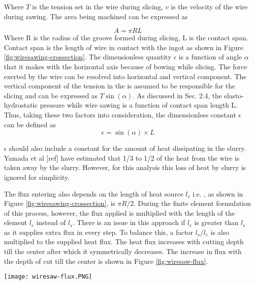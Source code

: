 Where $T$ is the tension set in the wire during slicing, $v$ is the velocity of the wire during sawing. The area being machined can be expressed as

\begin{equation}
A = \pi R L
   \label {wire_eq3}
\end{equation}
Where R is the radius of the groove formed during slicing, L is the contact span. Contact span is the length of wire in contact with the ingot as shown in Figure \ref{fig:wiresawing-crossection}. The dimensionless quantity $\epsilon$ is a function of angle $\alpha$ that it makes with the horizontal axis because of bowing while slicing. The force exerted by the wire can be resolved into horizontal and vertical component. The vertical component of the tension in the is assumed to be responsible for the slicing and can be expressed as $T \sin (\alpha)$. As discussed in Sec. 2.4, the elasto-hydrostatic pressure while wire sawing is a function of contact span length L. Thus, taking these two factors into consideration, the dimensionless constant $\epsilon$ can be defined as 
\begin{equation}
\epsilon = \sin(\alpha) \times L
   \label {wire_eq4}
\end{equation}

$\epsilon$ should also include a constant for the amount of heat dissipating in the slurry. Yamada et al [ref] have estimated that 1/3 to 1/2 of the heat from the wire is taken away by the slurry. However, for this analysis this loss of heat by slurry is ignored for simplicity.  

The flux entering also depends on the length of heat source $l_{s}$ i.e. , as shown in Figure \ref{fig:wiresawing-crossection}, is $\pi R /2 $. During the finite element formulation of this process, however, the flux applied is multiplied with the length of the element $l_{e}$ instead of $l_{s}$. There is an issue in this approach if $l_{e}$ is greater than $l_{s}$ as it supplies extra flux in every step. To balance this, a factor $l_{s}/l_{e}$ is also multiplied to the supplied heat flux. The heat flux increases with cutting depth till the center after which it symmetrically decreases. The increase in flux with the depth of cut till the center is shown in Figure \ref{fig:wiresaw-flux}. 

\noindent
\begin{minipage}[c]{\textwidth}
\centering
        \captionsetup{type=figure}
        \texttt{[image: wiresaw-flux.PNG]}
        \label{fig:wiresaw-flux}
\end{minipage}

